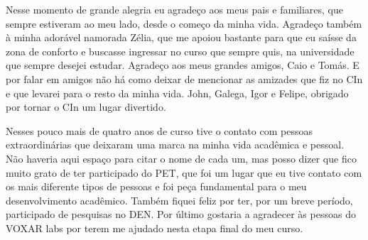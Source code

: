 
\acknowledgements
Nesse momento de grande alegria eu agradeço aos meus pais e familiares, que sempre estiveram ao meu lado, desde o começo da minha vida. Agradeço também à minha adorável namorada Zélia, que me apoiou bastante para que eu saísse da zona de conforto e buscasse ingressar no curso que sempre quis, na universidade que sempre desejei estudar. Agradeço aos meus grandes amigos, Caio e Tomás. E por falar em amigos não há como deixar de mencionar as amizades que fiz no CIn e que levarei para o resto da minha vida. John, Galega, Igor e Felipe, obrigado por tornar o CIn um lugar divertido.

Nesses pouco mais de quatro anos de curso tive o contato com pessoas extraordinárias que deixaram uma marca na minha vida acadêmica e pessoal. Não haveria aqui espaço para citar o nome de cada um, mas posso dizer que fico muito grato de ter participado do PET, que foi um lugar que eu tive contato com os mais diferente tipos de pessoas e foi peça fundamental para o meu desenvolvimento acadêmico. Também fiquei feliz por ter, por um breve período, participado de pesquisas no DEN. Por último gostaria a agradecer às pessoas do VOXAR labs por terem me ajudado nesta etapa final do meu curso.

